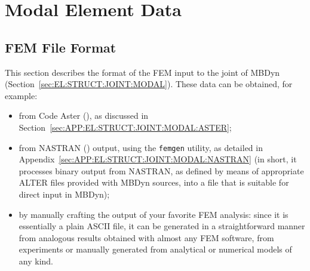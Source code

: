 %
%
%
%
%
% 
%
%

\chapter{Modal Element Data}

\section{FEM File Format}
\label{sec:APP:EL:STRUCT:JOINT:MODAL:FORMAT}

This section describes the format of the FEM input to the 
joint of MBDyn (Section~\ref{sec:EL:STRUCT:JOINT:MODAL}).
These data can be obtained, for example:
\begin{itemize}
\item from Code Aster
(),
as discussed in Section~\ref{sec:APP:EL:STRUCT:JOINT:MODAL:ASTER};
\item from NASTRAN
()
output, using the \texttt{femgen} utility,
as detailed in Appendix~\ref{sec:APP:EL:STRUCT:JOINT:MODAL:NASTRAN}
(in short, it processes binary output from NASTRAN, as defined by means
of appropriate ALTER files provided with MBDyn sources, into a file
that is suitable for direct input in MBDyn);
\item by manually crafting the output of your favorite FEM analysis:
since it is essentially a plain ASCII file, it can be generated
in a straightforward manner from analogous results obtained with
almost any FEM software, from experiments or manually generated
from analytical or numerical models of any kind.
\end{itemize}

